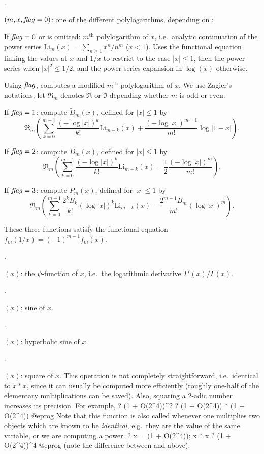 .

$(m,x,{\hbox{\it f\kern0pt lag\/}=0})$: one of the different polylogarithms,
depending on \fl:

If $\hbox{\it f\kern0pt lag\/}=0$ or is omitted: $m^\text{th}$ polylogarithm of $x$, i.e.~analytic
continuation of the power series $\text{Li}_m(x)=\sum_{n\ge1}x^n/n^m$
($x < 1$). Uses the functional equation linking the values at $x$ and $1/x$
to restrict to the case $|x|\leq 1$, then the power series when
$|x|^2\le1/2$, and the power series expansion in $\log(x)$ otherwise.

Using $\hbox{\it f\kern0pt lag\/}$, computes a modified $m^\text{th}$ polylogarithm of $x$.
We use Zagier's notations; let $\Re_m$ denotes $\Re$ or $\Im$ depending
whether $m$ is odd or even:

If $\hbox{\it f\kern0pt lag\/}=1$: compute $\tilde D_m(x)$, defined for $|x|\le1$ by
$$\Re_m\left(\sum_{k=0}^{m-1} \dfrac{(-\log|x|)^k}{k!}\text{Li}_{m-k}(x)
+\dfrac{(-\log|x|)^{m-1}}{m!}\log|1-x|\right).$$

If $\hbox{\it f\kern0pt lag\/}=2$: compute $D_m(x)$, defined for $|x|\le1$ by
$$\Re_m\left(\sum_{k=0}^{m-1}\dfrac{(-\log|x|)^k}{k!}\text{Li}_{m-k}(x)
-\dfrac{1}{2}\dfrac{(-\log|x|)^m}{m!}\right).$$

If $\hbox{\it f\kern0pt lag\/}=3$: compute $P_m(x)$, defined for $|x|\le1$ by
$$\Re_m\left(\sum_{k=0}^{m-1}\dfrac{2^kB_k}{k!}(\log|x|)^k\text{Li}_{m-k}(x)
-\dfrac{2^{m-1}B_m}{m!}(\log|x|)^m\right).$$

These three functions satisfy the functional equation
$f_m(1/x) = (-1)^{m-1}f_m(x)$.

.

$(x)$: the $\psi$-function of $x$, i.e.~the
logarithmic derivative $\Gamma'(x)/\Gamma(x)$.

.

$(x)$: sine of $x$.

.

$(x)$: hyperbolic sine of $x$.

.

$(x)$: square of $x$. This operation is not completely
straightforward, i.e.~identical to $x * x$, since it can usually be
computed more efficiently (roughly one-half of the elementary
multiplications can be saved). Also, squaring a $2$-adic number increases
its precision. For example,
\bprog
? (1 + O(2^4))^2
? (1 + O(2^4)) * (1 + O(2^4))
@eprog\noindent
Note that this function is also called whenever one multiplies two objects
which are known to be \emph{identical}, e.g.~they are the value of the same
variable, or we are computing a power.
\bprog
? x = (1 + O(2^4)); x * x
? (1 + O(2^4))^4
@eprog\noindent
(note the difference between  and  above).

